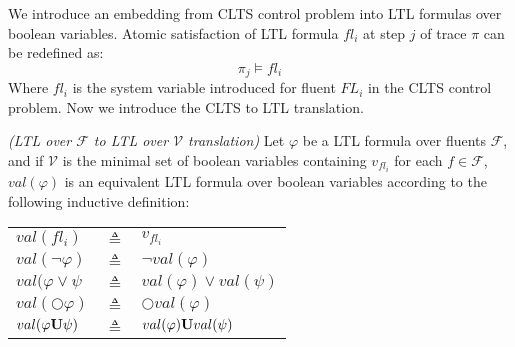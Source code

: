 We introduce an embedding from CLTS control problem into LTL formulas over boolean variables.
%
Atomic satisfaction of LTL formula $fl_i$ at step $j$ of trace $\pi$ can be redefined as:
\[ \pi_j \models fl_i \]
Where $fl_i$ is the system variable introduced for fluent $FL_i$ in the CLTS control problem.
Now we introduce the CLTS to LTL translation.
\begin{definition}
	\label{def:val_ltl} \emph{(LTL over $\mathcal{F}$ to LTL over $\mathcal{V}$ translation)} 
	Let $\varphi$ be a LTL formula over fluents $\mathcal{F}$, and if $\mathcal{V}$ is the minimal set of boolean variables containing $v_{fl_i}$ for each $f \in \mathcal{F}$, $val(\varphi)$ is an equivalent LTL formula over boolean variables according to the following inductive definition:\\
	
	\begin{tabular}{ l c l }
		$val(fl_i)$ & $\triangleq$ & $v_{fl_i}$\\	
		$val(\neg \varphi)$ & $\triangleq$ & $\neg val(\varphi)$\\
		$val(\varphi \vee \psi$ & $\triangleq$ & $val(\varphi) \vee val(\psi)$\\
		$val(\bigcirc \varphi)$ & $\triangleq$ & $\bigcirc val(\varphi)$\\
		$val(\varphi {\bf U} \psi)$ & $\triangleq$ & $val(\varphi) {\bf U} val(\psi)$\\
	\end{tabular}	
\end{definition}

